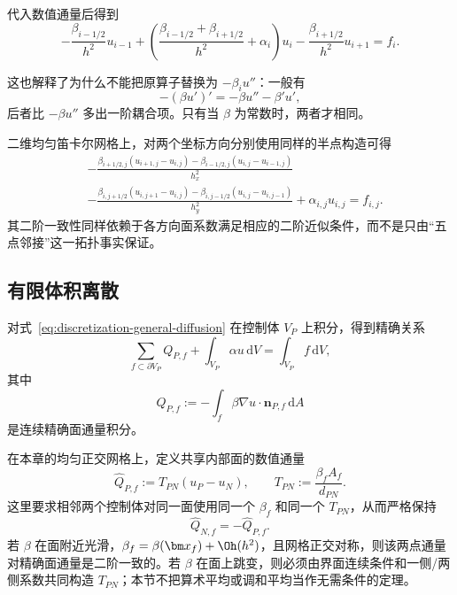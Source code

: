代入数值通量后得到
\begin{equation}
\boxed{
-\frac{\beta_{i-1/2}}{h^2}u_{i-1}
+\left(
\frac{\beta_{i-1/2}+\beta_{i+1/2}}{h^2}
+\alpha_i
\right)u_i
-\frac{\beta_{i+1/2}}{h^2}u_{i+1}
=f_i.
}
\label{eq:discretization-fd-variable-row}
\end{equation}

这也解释了为什么不能把原算子替换为 $-\beta_i u''$：一般有
\begin{equation}
-(\beta u')'=-\beta u''-\beta'u',
\end{equation}
后者比 $-\beta u''$ 多出一阶耦合项。只有当 $\beta$ 为常数时，两者才相同。

二维均匀笛卡尔网格上，对两个坐标方向分别使用同样的半点构造可得
\begin{align}
&-\frac{
\beta_{i+1/2,j}(u_{i+1,j}-u_{i,j})
-\beta_{i-1/2,j}(u_{i,j}-u_{i-1,j})
}{h_x^2} \\
&-\frac{
\beta_{i,j+1/2}(u_{i,j+1}-u_{i,j})
-\beta_{i,j-1/2}(u_{i,j}-u_{i,j-1})
}{h_y^2}
+\alpha_{i,j}u_{i,j}
=f_{i,j}.
\label{eq:discretization-fd-variable-two-dimensional}
\end{align}
其二阶一致性同样依赖于各方向面系数满足相应的二阶近似条件，而不是只由“五点邻接”这一拓扑事实保证。

\subsection{有限体积离散}

对式~\eqref{eq:discretization-general-diffusion} 在控制体 $V_P$ 上积分，得到精确关系
\begin{equation}
\sum_{f\subset\partial V_P}Q_{P,f}
+
\int_{V_P}\alpha u\,\mathrm dV
=
\int_{V_P}f\,\mathrm dV,
\label{eq:discretization-fv-balance-exact-general}
\end{equation}
其中
\begin{equation}
Q_{P,f}
:=-\int_f\beta\nabla u\cdot\bm n_{P,f}\,\mathrm dA
\label{eq:discretization-bc-flux-definition}
\end{equation}
是连续精确面通量积分。

在本章的均匀正交网格上，定义共享内部面的数值通量
\begin{equation}
\boxed{
\widehat Q_{P,f}
:=T_{PN}(u_P-u_N),
\qquad
T_{PN}:=\frac{\beta_fA_f}{d_{PN}}.
}
\label{eq:discretization-fv-two-point-flux}
\end{equation}
这里要求相邻两个控制体对同一面使用同一个 $\beta_f$ 和同一个 $T_{PN}$，从而严格保持
\begin{equation}
\widehat Q_{N,f}=-\widehat Q_{P,f}.
\label{eq:discretization-fv-general-antisymmetry}
\end{equation}
若 $\beta$ 在面附近光滑，$\beta_f=\beta(\bm x_f)+\Oh(h^2)$，且网格正交对称，则该两点通量对精确面通量是二阶一致的。若 $\beta$ 在面上跳变，则必须由界面连续条件和一侧/两侧系数共同构造 $T_{PN}$；本节不把算术平均或调和平均当作无需条件的定理。

